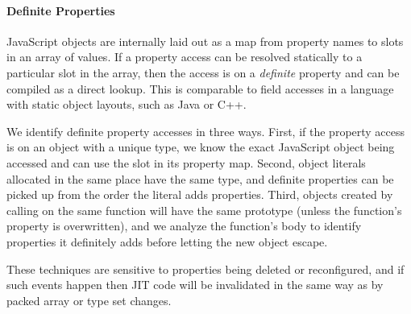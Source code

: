 \paragraph{Definite Properties}
\label{sec:definite-properties}

JavaScript objects are internally laid out as a map from property names
to slots in an array of values.
If a property access can be resolved statically to a particular slot in the
array, then the access is on a {\it definite} property and can be compiled
as a direct lookup. This is comparable to
field accesses in a language with static object layouts,
such as Java or C++.

We identify definite property accesses in three ways.
First, if the property access is on an object with a unique type,
we know the exact JavaScript object being accessed and can use the slot
in its property map.
Second, object literals allocated in the same place have the same type,
and definite properties can be picked up from the order the literal
adds properties.
Third, objects created by calling  on the same function will have the
same prototype (unless the function's  property is overwritten),
and we analyze the function's body to identify properties it definitely
adds before letting the new object escape.

These techniques are sensitive to properties being deleted or
reconfigured, and if such events happen then JIT code will be invalidated
in the same way as by packed array or type set changes.

